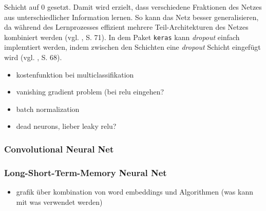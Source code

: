 \documentclass[a4paper,11pt]{article}
\begin{document}
Schicht auf $0$ gesetzt. Damit wird erzielt, dass verschiedene Fraktionen des Netzes aus unterschiedlicher Information lernen. So kann das Netz besser generalisieren, da während des Lernprozesses effizient mehrere Teil-Architekturen des Netzes kombiniert werden (vgl. \cite{deepEssentials}, S. 71). In dem Paket \texttt{keras} kann \textit{dropout} einfach implemtiert werden, indem zwischen den Schichten eine \textit{dropout} Schicht eingefügt wird (vgl. \cite{keras}, S. 68).

\begin{itemize}
    \item kostenfunktion bei multiclassifikation
    \item vanishing gradient problem (bei relu eingehen?
    \item batch normalization
    \item dead neurons, lieber leaky relu?
\end{itemize}{}



\subsubsection{Convolutional Neural Net} \label{kap:CNN}
\subsubsection{Long-Short-Term-Memory Neural Net} \label{kap:LSTM}

\begin{itemize}
    \item grafik über kombination von word embeddings und Algorithmen (was kann mit was verwendet werden)
\end{itemize}{}
\end{document}
